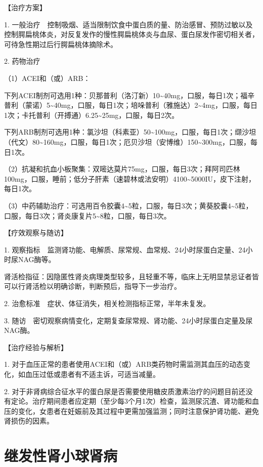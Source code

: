 【治疗方案】

1.
一般治疗　控制吸烟、适当限制饮食中蛋白质的量、防治感冒、预防过敏以及控制腭扁桃体炎，对反复发作的慢性腭扁桃体炎与血尿、蛋白尿发作密切相关者，可待急性期过后行腭扁桃体摘除术。

2. 药物治疗

（1）ACEI和（或）ARB：

下列ACEI制剂可选用1种：贝那普利（洛汀新）10\textasciitilde{}40mg，口服，每日1次；福辛普利（蒙诺）5\textasciitilde{}40mg，口服，每日1次；培哚普利（雅施达）2\textasciitilde{}4mg，口服，每日1次；卡托普利（开搏通）6.25\textasciitilde{}25mg，口服，每日2次。

下列ARB制剂可选用1种：氯沙坦（科素亚）50\textasciitilde{}100mg，口服，每日1次；缬沙坦（代文）80\textasciitilde{}160mg，口服，每日1次；厄贝沙坦（安博维）150\textasciitilde{}300mg，口服，每日1次。

（2）抗凝和抗血小板聚集：双嘧达莫片75mg，口服，每日3次；拜阿司匹林100mg，口服，睡前；低分子肝素（速碧林或法安明）4100\textasciitilde{}5000IU，皮下注射，每日1次。

（3）中药辅助治疗：可选用百令胶囊4\textasciitilde{}5粒，口服，每日3次；黄葵胶囊4\textasciitilde{}5粒，口服，每日3次；肾炎康复片5\textasciitilde{}8粒，口服，每日3次。

【疗效观察与随访】

1.
观察指标　监测肾功能、电解质、尿常规、血常规、24小时尿蛋白定量、24小时尿NAG酶等。

肾活检指征：因隐匿性肾炎病理类型较多，且轻重不等，临床上无明显禁忌证者皆可以行肾活检以明确诊断，判断预后，指导下一步治疗。

2. 治愈标准　症状、体征消失，相关检测指标正常，半年未复发。

3.
随访　密切观察病情变化，定期复查尿常规、肾功能、24小时尿蛋白定量及尿NAG酶。

【治疗经验与解析】

1.
对于血压正常的患者使用ACEI和（或）ARB类药物时需监测其血压的动态变化，如血压过低或患者有不适主诉，可适当减量。

2.
对于非肾病综合征水平的蛋白尿是否需要使用糖皮质激素治疗的问题目前还没有定论。治疗期间患者应定期（至少每3个月1次）检查，监测尿沉渣、肾功能和血压的变化，女患者在妊娠前及其过程中更需加强监测；同时注意保护肾功能、避免肾损伤的因素。

\section{继发性肾小球肾病}

